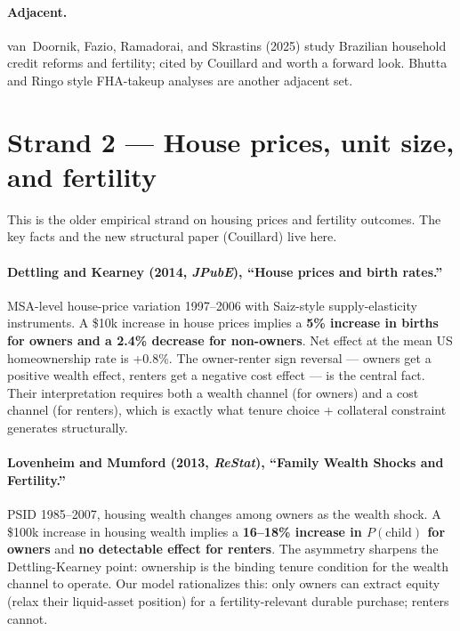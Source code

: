 \documentclass[11pt]{article}
\begin{document}
\paragraph{Adjacent.}
van~Doornik, Fazio, Ramadorai, and Skrastins (2025) study Brazilian household credit reforms and fertility; cited by Couillard and worth a forward look. Bhutta and Ringo style FHA-takeup analyses are another adjacent set.

\section{Strand 2 --- House prices, unit size, and fertility}

This is the older empirical strand on housing prices and fertility outcomes. The key facts and the new structural paper (Couillard) live here.

\paragraph{Dettling and Kearney (2014, \emph{JPubE}), ``House prices and birth rates.''}
MSA-level house-price variation 1997--2006 with Saiz-style supply-elasticity instruments. A \$10k increase in house prices implies a \textbf{5\% increase in births for owners and a 2.4\% decrease for non-owners}. Net effect at the mean US homeownership rate is +0.8\%. The owner-renter sign reversal --- owners get a positive wealth effect, renters get a negative cost effect --- is the central fact. Their interpretation requires both a wealth channel (for owners) and a cost channel (for renters), which is exactly what tenure choice + collateral constraint generates structurally.

\paragraph{Lovenheim and Mumford (2013, \emph{ReStat}), ``Family Wealth Shocks and Fertility.''}
PSID 1985--2007, housing wealth changes among owners as the wealth shock. A \$100k increase in housing wealth implies a \textbf{16--18\% increase in $P(\text{child})$ for owners} and \textbf{no detectable effect for renters}. The asymmetry sharpens the Dettling-Kearney point: ownership is the binding tenure condition for the wealth channel to operate. Our model rationalizes this: only owners can extract equity (relax their liquid-asset position) for a fertility-relevant durable purchase; renters cannot.
\end{document}
